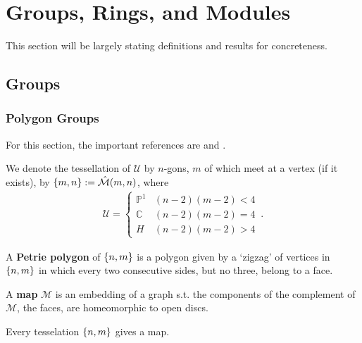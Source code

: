 \documentclass{article}
\begin{document}
\section{Groups, Rings, and Modules}

This section will be largely stating definitions and results for concreteness. 
\subsection{Groups}

\subsubsection{Polygon Groups}
For this section, the important references are \cite{Singerman1997} and \cite{Coxeter1957}.

\begin{definition}
	We denote the tessellation of $\mathcal{U}$ by $n$-gons, $m$ of which meet at a vertex (if it exists), by $\left\{ m,n \right\} := \hat{\mathcal{M}}(m,n)$, where 
	\begin{align*}
	\mathcal{U} = \left \lbrace \begin{array}{cc}
		\mathbb{P}^1 & (n -2)(m-2)<4 \\
		\mathbb{C} & (n-2)(m-2) = 4 \\
		H & (n-2)(m-2) > 4
	\end{array}	\right . \, . 
	\end{align*}
\end{definition}

\begin{definition}
	A \textbf{Petrie polygon} of $\left\{ n,m \right\}$ is a polygon given by a `zigzag' of vertices in $\left\{ n,m \right\}$ in which every two consecutive sides, but no three, belong to a face. 
\end{definition}

\begin{definition}
	A \textbf{map} $\mathcal{M}$ is an embedding of a graph s.t. the components of the complement of $\mathcal{M}$, the faces, are homeomorphic to open discs.  
\end{definition}

\begin{example}
	Every tesselation $\left\{ n,m \right\}$ gives a map. 
\end{example}
\end{document}
